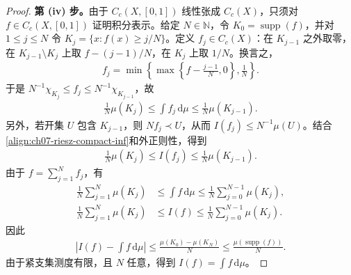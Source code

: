 \documentclass[../../main.tex]{subfiles}
\begin{document}
\begin{proof}
\textbf{第 (iv) 步。}由于 $C_c(X,[0,1])$ 线性张成 $C_c(X)$，只须对 $f\in C_c(X,[0,1])$ 证明积分表示。给定 $N\in\mathbb N$，令 $K_0=\operatorname{supp}(f)$，并对 $1\leqslant j\leqslant N$ 令 $K_j=\{x:f(x)\geqslant j/N\}$。定义 $f_j\in C_c(X)$：在 $K_{j-1}$ 之外取零，在 $K_{j-1}\setminus K_j$ 上取 $f-(j-1)/N$，在 $K_j$ 上取 $1/N$。换言之，
\begin{align*}
f_j=\min\left\{\max\left\{f-\frac{j-1}{N},0\right\},\frac1N\right\}.
\end{align*}
于是 $N^{-1}\chi_{K_j}\leqslant f_j\leqslant N^{-1}\chi_{K_{j-1}}$，故
\begin{align*}
\frac1N\mu(K_j)\leqslant\int f_j\,\mathrm d\mu
\leqslant\frac1N\mu(K_{j-1}).
\end{align*}
另外，若开集 $U$ 包含 $K_{j-1}$，则 $Nf_j\prec U$，从而 $I(f_j)\leqslant N^{-1}\mu(U)$。结合\eqref{align:ch07-riesz-compact-inf}和外正则性，得到
\begin{align*}
\frac1N\mu(K_j)\leqslant I(f_j)\leqslant\frac1N\mu(K_{j-1}).
\end{align*}
由于 $f=\sum_{j=1}^Nf_j$，有
\begin{align*}
\frac1N\sum_{j=1}^N\mu(K_j)
&\leqslant\int f\,\mathrm d\mu
\leqslant\frac1N\sum_{j=0}^{N-1}\mu(K_j),\\
\frac1N\sum_{j=1}^N\mu(K_j)
&\leqslant I(f)
\leqslant\frac1N\sum_{j=0}^{N-1}\mu(K_j).
\end{align*}
因此
\begin{align*}
\left|I(f)-\int f\,\mathrm d\mu\right|
\leqslant\frac{\mu(K_0)-\mu(K_N)}N
\leqslant\frac{\mu(\operatorname{supp}(f))}N.
\end{align*}
由于紧支集测度有限，且 $N$ 任意，得到 $I(f)=\int f\,\mathrm d\mu$。
\end{proof}
\end{document}
